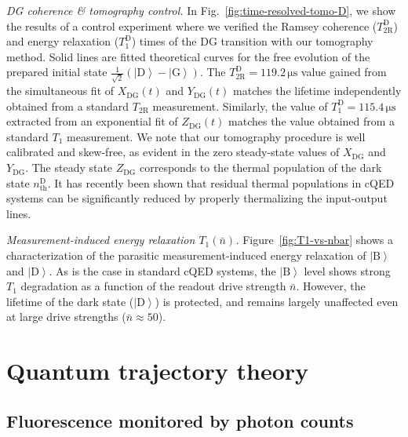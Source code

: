 \documentclass[
						superscriptaddress, 																 amsmath, amssymb,
		 aps,  prb,  
										floatfix,
		linenumbers,
			]{revtex4-1}
\newcommand{\ket}[1]{\left|#1\right>}
\newcommand{\B}{\ket{\mathrm{B}}}
\newcommand{\G}{\ket{\mathrm{G}}}
\newcommand{\D}{\ket{\mathrm{D}}}
\begin{document}
\textit{DG coherence \& tomography control.}
In Fig.~\ref{fig:time-resolved-tomo-D}, we show the results of a control experiment where we verified the Ramsey coherence ($T_\mathrm{2R}^\mathrm{D}$) and energy relaxation ($T_\mathrm{1}^\mathrm{D}$) times of the DG transition with our tomography method.
Solid lines are fitted theoretical curves for the free evolution of the prepared initial state $\frac{1}{\sqrt{2}} \left( \D - \G \right)$.
The $T_\mathrm{2R}^\mathrm{D} = 119.2\,\mathrm{\mu s}$ value gained from the simultaneous fit of $X_\mathrm{DG}(t)$ and $Y_\mathrm{DG}(t)$  matches the lifetime independently obtained from a standard $T_\mathrm{2R}$ measurement. Similarly, the  value of  $T_\mathrm{1}^\mathrm{D} = 115.4\,\mathrm{\mu s}$ extracted from an exponential fit of  $Z_\mathrm{DG}(t)$ matches the value obtained from a standard $T_\mathrm{1}$ measurement. We note that our tomography procedure is well calibrated and skew-free, as evident in the zero steady-state values of $X_\mathrm{DG}$ and $Y_\mathrm{DG}$. The steady state $Z_\mathrm{DG}$ corresponds to the  thermal population of the dark state $n_{\mathrm{th}}^{\mathrm{D}}$. It has recently been shown that residual thermal populations in cQED systems can be significantly reduced by properly thermalizing the input-output lines.\cite{Yeh2017Atten,Wang2019-cav-atten}


\textit{Measurement-induced energy relaxation $T_1(\bar{n})$.} Figure~\ref{fig:T1-vs-nbar} shows a characterization of the parasitic measurement-induced energy relaxation  of $\B$ and $\D$.
As is the case in standard cQED systems\cite{Slichter2012, Slichter2016-T1vsNbar, Sank2016-T1vsNbar}, the $\B$ level shows strong $T_1$ degradation\cite{Boissonneault2008, Boissonneault2009-Photon-induced-relax,Verney2018,Lescanne2018} as a function of the readout drive strength $\bar{n}$.
However, the lifetime of the dark state ($\D$) is protected, and remains largely unaffected even at large drive strengths ($\bar{n}\approx50$).





\section{Quantum trajectory theory}
\label{sec:quantum-traj-theory}

\subsection{Fluorescence monitored by photon counts}
\label{sec:fluorescence_monitored_by_photon_counts}
\end{document}
